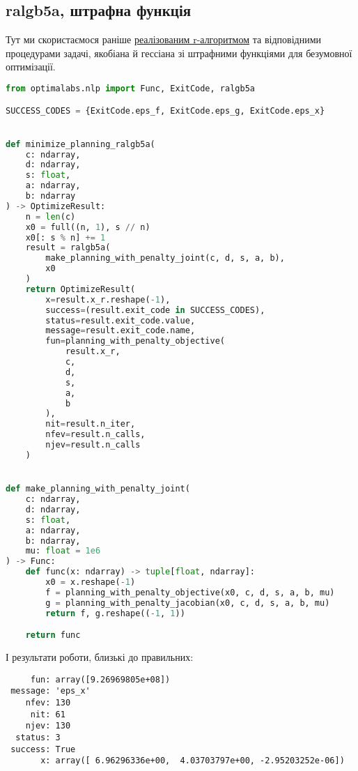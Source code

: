 \documentclass[12pt]{report}
\begin{document}
    \subsection*{ralgb5a, штрафна функція}\label{subsec:ralgb5a-penalty-objective}

    Тут ми скористаємося раніше
    \href{https://github.com/xXxRisingTidexXx/optima-labs/blob/62f605afb3c3caf3be5f4a18b1b14d9a99404bd4/optimalabs/nlp.py}{реалізованим r-алгоритмом}
    та відповідними процедурами задачі, якобіана й гессіана зі штрафними функціями для безумовної оптимізації.

    \begin{lstlisting}[language=Python,label={lst:ralgb5a-penalty-objective}]
from optimalabs.nlp import Func, ExitCode, ralgb5a

SUCCESS_CODES = {ExitCode.eps_f, ExitCode.eps_g, ExitCode.eps_x}


def minimize_planning_ralgb5a(
    c: ndarray,
    d: ndarray,
    s: float,
    a: ndarray,
    b: ndarray
) -> OptimizeResult:
    n = len(c)
    x0 = full((n, 1), s // n)
    x0[: s % n] += 1
    result = ralgb5a(
        make_planning_with_penalty_joint(c, d, s, a, b),
        x0
    )
    return OptimizeResult(
        x=result.x_r.reshape(-1),
        success=(result.exit_code in SUCCESS_CODES),
        status=result.exit_code.value,
        message=result.exit_code.name,
        fun=planning_with_penalty_objective(
            result.x_r,
            c,
            d,
            s,
            a,
            b
        ),
        nit=result.n_iter,
        nfev=result.n_calls,
        njev=result.n_calls
    )


def make_planning_with_penalty_joint(
    c: ndarray,
    d: ndarray,
    s: float,
    a: ndarray,
    b: ndarray,
    mu: float = 1e6
) -> Func:
    def func(x: ndarray) -> tuple[float, ndarray]:
        x0 = x.reshape(-1)
        f = planning_with_penalty_objective(x0, c, d, s, a, b, mu)
        g = planning_with_penalty_jacobian(x0, c, d, s, a, b, mu)
        return f, g.reshape((-1, 1))

    return func
    \end{lstlisting}

    І результати роботи, близькі до правильних:

    \begin{verbatim}
     fun: array([9.26969805e+08])
 message: 'eps_x'
    nfev: 130
     nit: 61
    njev: 130
  status: 3
 success: True
       x: array([ 6.96296336e+00,  4.03703797e+00, -2.95203252e-06])
    \end{verbatim}
\end{document}
